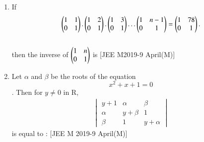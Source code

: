 \documentclass[journal,,12pt,onecolumn]{IEEEtran}
\theoremstyle{remark}
\begin{document}
\begin{enumerate}
\begin{enumerate}
\end{enumerate} 
\item If \begin{align}\begin{pmatrix}
    1 & 1 \\
    0 & 1
\end{pmatrix}.\begin{pmatrix}
    1 & 2 \\
    0 & 1
\end{pmatrix}.\begin{pmatrix}
    1 & 3 \\
    0 & 1
\end{pmatrix}\dots \begin{pmatrix}
    1 & n-1 \\
    0 & 1
\end{pmatrix}=\begin{pmatrix}
    1 & 78 \\
    0 & 1
\end{pmatrix}.\end{align}\\
then the inverse of $\begin{pmatrix}
    1 & n \\
    0 & 1
\end{pmatrix}$ is 
\hfill{[JEE M2019-9 April(M)]} 
\begin{enumerate}
\end{enumerate}
\item Let $\alpha$ and $\beta$ be the roots of the equation $$x^2+x+1=0$$. Then for $y\ne0$ in R,\\
\begin{align}\begin{vmatrix}
   y+1 & \alpha & \beta \\
    \alpha & y+\beta & 1 \\
    \beta & 1 & y+\alpha
\end{vmatrix} \end{align} is equal to : 
\hfill{[JEE M 2019-9 April(M)]} 
\begin{enumerate}
\end{enumerate}

\end{enumerate}
    
\end{document}
